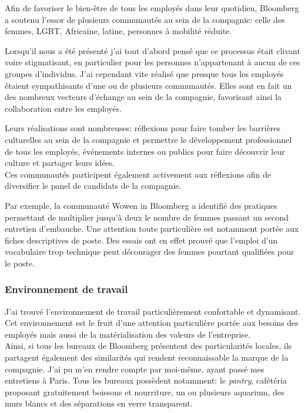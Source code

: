 \documentclass[11pt, oneside, titlepage, a4paper]{article}
\begin{document}
Afin de favoriser le bien-être de tous les employés dans leur quotidien, Bloomberg a soutenu l'essor de plusieurs communautés au sein de la compagnie: celle des femmes, LGBT, Africaine, latine, personnes à mobilité réduite.

Lorsqu'il nous a été présenté j'ai tout d'abord pensé que ce processus était clivant voire stigmatisant, en particulier pour les personnes n'appartenant à aucun de ces \og groupes\fg{} d'individus. J'ai cependant vite réalisé que presque tous les employés étaient sympathisants d'une ou de plusieurs communautés. Elles sont en fait un des nombreux vecteurs d'échange au sein de la compagnie, favorisant ainsi la collaboration entre les employés.

Leurs réalisations sont nombreuses: réflexions pour faire tomber les barrières culturelles au sein de la compagnie et permettre le développement professionnel de tous les employés, événements internes ou publics pour faire découvrir leur culture et partager leurs idées.
\\

Ces communautés participent également activement aux réflexions afin de diversifier le panel de candidats de la compagnie.

Par exemple, la communauté Wowen in Bloomberg a identifié des pratiques permettant de multiplier jusqu'à deux le nombre de femmes passant un second entretien d'embauche. Une attention toute particulière est notamment portée aux fiches descriptives de poste. Des essais ont en effet prouvé que l'emploi d'un vocabulaire trop technique peut décourager des femmes pourtant qualifiées pour le poste.
		\subsubsection{Environnement de travail}
J'ai trouvé l'environnement de travail particulièrement confortable et dynamisant. Cet environnement est le fruit d'une attention particulière portée aux besoins des employés mais aussi de la matérialisation des valeurs de l'entreprise.
\\

Ainsi, si tous les bureaux de Bloomberg présentent des particularités locales, ils partagent également des similarités qui rendent reconnaissable la marque de la compagnie. J'ai pu m'en rendre compte par moi-même, ayant passé mes entretiens à Paris. Tous les bureaux possèdent notamment: le \textit{pantry}, cafétéria proposant gratuitement boissons et nourriture, un ou plusieurs aquarium, des murs blancs et des séparations en verre transparent.
\end{document}
